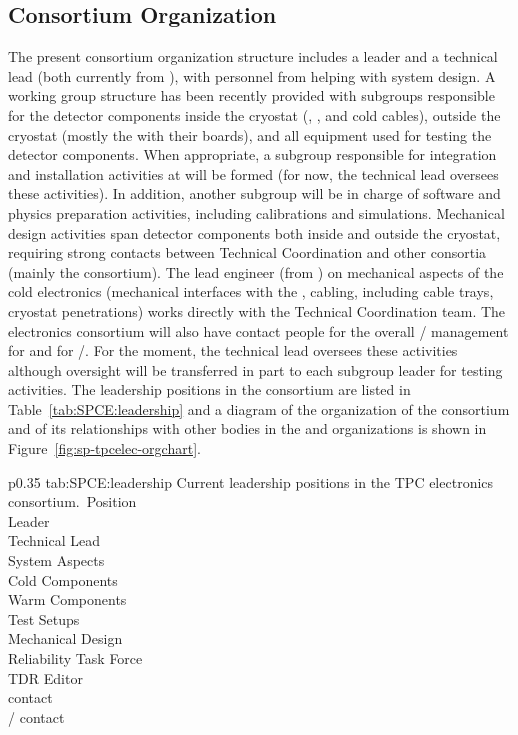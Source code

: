 \subsection{Consortium Organization}
\label{sec:fdsp-tpcelec-management-consort}

The present consortium organization
structure includes a leader and a technical lead (both currently
from ), with personnel from  helping with system design. A working group structure has been recently 
provided with subgroups responsible for the detector 
components inside the cryostat (, , and
cold cables), outside the cryostat (mostly the  with 
their boards), and all equipment
used for testing the detector components. When appropriate, a subgroup
responsible for integration and installation activities at
 will be formed (for now, the technical lead oversees 
these activities). In addition,
another subgroup will be in charge of software and physics
preparation activities, including calibrations and simulations.
Mechanical design activities span detector components both inside
and outside the cryostat, requiring strong contacts between 
Technical Coordination and other consortia (mainly the 
consortium). The lead engineer (from ) on mechanical aspects of the cold
electronics (mechanical interfaces with the , cabling, including 
cable trays, cryostat penetrations) works directly with
the Technical Coordination team. The  electronics consortium will also have 
contact people for the overall / management for
 and for /. For the moment, the technical lead oversees these activities although oversight
will be transferred in part to each subgroup leader for testing
activities. The leadership positions in the consortium 
are listed in Table~\ref{tab:SPCE:leadership} and a diagram of
the organization of the consortium and of its relationships
with other bodies in the  and  organizations
is shown in Figure~\ref{fig:sp-tpcelec-orgchart}.

\begin{dunetable}
{p{0.35\textwidth}}
{tab:SPCE:leadership}
{Current leadership positions in the TPC electronics consortium.}\
Position \\ \toprowrule
Leader \\ \colhline 
Technical Lead \\ \colhline 
System Aspects \\ \colhline 
Cold Components \\ \colhline 
Warm Components \\ \colhline 
Test Setups \\ \colhline 
Mechanical Design \\ \colhline 
Reliability Task Force \\ \colhline 
TDR Editor \\ \colhline 
{} contact \\ \colhline 
{}/ contact \\ \colhline 
\end{dunetable}

